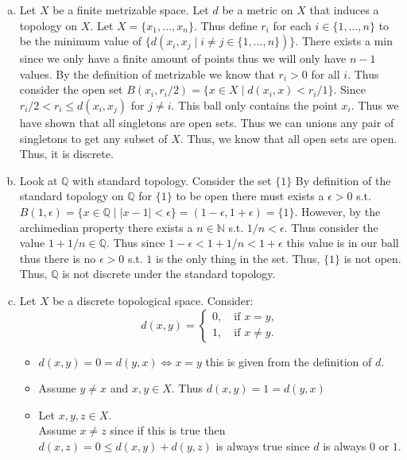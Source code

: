 \documentclass[12pt, letterpaper]{article}
\theoremstyle{definition}
\newcommand{\Q}{\mathbb{Q}}
\newcommand{\N}{\mathbb{N}}
\renewcommand{\t}[1]{\text{#1}}
\begin{document}
\begin{enumerate}[(a)]
    \item Let $X$ be a finite metrizable space. Let $d$ be a metric on $X$ that induces a topology on $X$.
    Let $X=\{x_1,\dots,x_n\}$. Thus define $r_i$ for each $i \in \{1,\dots,n\}$ to be the minimum value of $\{d(x_i,x_j \mid i \neq j \in \{1,\dots,n\})\}$. There exists a min since we only have a finite amount of points thus we will only have $n-1$ values.
    By the definition of metrizable we know that $r_i>0$ for all $i$. Thus consider the open set $B(x_i,r_i/2)=\{x \in X \mid d(x_i,x)<r_i/1\}$. Since $r_i/2<r_i \leq d(x_i,x_j)$ for $j \neq i$. This ball only contains the point $x_i$. Thus we have shown that all singletons are open sets. Thus we can unions any pair of singletons to get any subset of $X$. Thus, we know that all open sets are open.
    Thus, it is discrete.
    \item Look at $\Q$ with standard topology. Consider the set $\{1\}$ By definition of the standard topology on $\Q$ for $\{1\}$ to be open there must exists a $\epsilon >0$ s.t. $B(1,\epsilon)=\{x \in \Q \mid |x-1|< \epsilon\}=(1-\epsilon,1+\epsilon)=\{1\}$. However, by the archimedian property there exists a $n \in \N$ s.t. $1/n < \epsilon$. Thus consider the value $1+1/n \in \Q$. Thus since $1-\epsilon < 1+1/n < 1 + \epsilon$ this value is in our ball thus there is no
    $\epsilon >0$ s.t. $1$ is the only thing in the set. Thus, $\{1\}$ is not open. Thus, $\Q$ is not discrete under the standard topology.
    \item Let $X$ be a discrete topological space. Consider:\\
    \begin{equation*}
        d(x,y)=\begin{cases}
            0, \quad \t{if } x=y,\\
            1, \quad \t{if } x\neq y.
        \end{cases}
    \end{equation*}
    \begin{itemize}
        \item $d(x,y)=0=d(y,x) \iff x=y$ this is given from the definition of $d$.
        \item Assume $y\neq x$ and $x,y \in X$. Thus $d(x,y)=1=d(y,x)$
        \item Let $x,y,z \in X$.\\
        Assume $x \neq z$ since if this is true then $d(x,z)=0 \leq d(x,y)+d(y,z)$ is always true since $d$ is always $0$ or $1$.\\

\end{itemize}
\end{enumerate}
\end{document}

